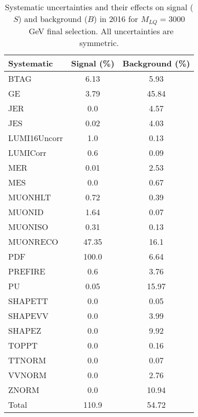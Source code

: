 \begin{table}[htbp]
\begin{center}
\caption{Systematic uncertainties and their effects on signal ($S$) and background ($B$) in 2016 for $M_{LQ}=3000$~GeV final selection. All uncertainties are symmetric.}
\begin{tabular}{lcc}
\hline\hline
Systematic & Signal (\%) & Background (\%) \\ \hline 
BTAG & 6.13 & 5.93\\ 
GE & 3.79 & 45.84\\ 
JER & 0.0 & 4.57\\ 
JES & 0.02 & 4.03\\ 
LUMI16Uncorr & 1.0 & 0.13\\ 
LUMICorr & 0.6 & 0.09\\ 
MER & 0.01 & 2.53\\ 
MES & 0.0 & 0.67\\ 
MUONHLT & 0.72 & 0.39\\ 
MUONID & 1.64 & 0.07\\ 
MUONISO & 0.31 & 0.13\\ 
MUONRECO & 47.35 & 16.1\\ 
PDF & 100.0 & 6.64\\ 
PREFIRE & 0.6 & 3.76\\ 
PU & 0.05 & 15.97\\ 
SHAPETT & 0.0 & 0.05\\ 
SHAPEVV & 0.0 & 3.99\\ 
SHAPEZ & 0.0 & 9.92\\ 
TOPPT & 0.0 & 0.16\\ 
TTNORM & 0.0 & 0.07\\ 
VVNORM & 0.0 & 2.76\\ 
ZNORM & 0.0 & 10.94\\ 
Total & 110.9 & 54.72\\ \hline \hline
\end{tabular}
\label{tab:SysUncertainties_uujj_3000}
\end{center}
\end{table}

